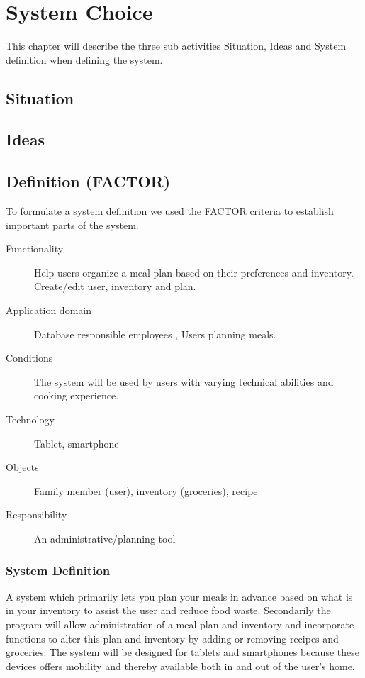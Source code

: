  \chapter{System Choice}
This chapter will describe the three sub activities Situation, Ideas and System definition when defining the system. 

\section{Situation}

\section{Ideas}

\section{Definition (FACTOR)}
To formulate a system definition we used the FACTOR \cite{OOAD_BATOF} criteria to establish important parts of the system.

\begin{description}
	\item[Functionality] Help users organize a meal plan based on their preferences and inventory. Create/edit user, inventory and plan.
	\item[Application domain] Database responsible employees , Users planning meals.
	\item[Conditions] The system will be used by users with varying technical abilities and cooking experience.
	\item[Technology] Tablet, smartphone
	\item[Objects] Family member (user), inventory (groceries), recipe
	\item[Responsibility] An administrative/planning tool
\end{description}

\subsection{System Definition}
A system which primarily lets you plan your meals in advance based on what is in your inventory to assist the user and reduce food waste. Secondarily the program will allow administration of a meal plan and inventory and incorporate functions to alter this plan and inventory by adding or removing recipes and groceries. The system will be designed for tablets and smartphones because these devices offers mobility and thereby available both in and out of the user’s home.
